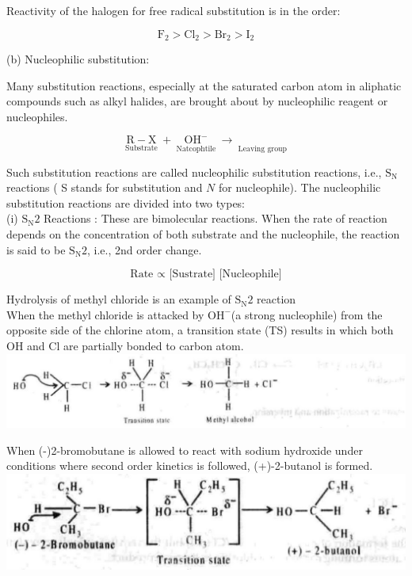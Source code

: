 \documentclass[10pt]{article}
\begin{document}
Reactivity of the halogen for free radical substitution is in the order:

$$
\mathrm{F}_{2}>\mathrm{Cl}_{2}>\mathrm{Br}_{2}>\mathrm{I}_{2}
$$

(b) Nucleophilic substitution:

Many substitution reactions, especially at the saturated carbon atom in aliphatic compounds such as alkyl halides, are brought about by nucleophilic reagent or nucleophiles.

$$
\underset{\text { Substrate }}{\mathrm{R}-\mathrm{X}}+\underset{\text { Natcophtile }}{\mathrm{OH}^{-}} \longrightarrow \underset{\text { Leaving group }}{ }
$$

Such substitution reactions are called nucleophilic substitution reactions, i.e., $\mathrm{S}_{\mathrm{N}}$ reactions ( S stands for substitution and $N$ for nucleophile). The nucleophilic substitution reactions are divided into two types:\\
(i) $\mathrm{S}_{\mathrm{N}} 2$ Reactions : These are bimolecular reactions. When the rate of reaction depends on the concentration of both substrate and the nucleophile, the reaction is said to be $\mathrm{S}_{\mathrm{N}} 2$, i.e., 2nd order change.

$$
\text { Rate } \propto \text { [Sustrate] [Nucleophile] }
$$

Hydrolysis of methyl chloride is an example of $\mathrm{S}_{\mathrm{N}} 2$ reaction\\
When the methyl chloride is attacked by $\mathrm{OH}^{-}$(a strong nucleophile) from the opposite side of the chlorine atom, a transition state (TS) results in which both OH and Cl are partially bonded to carbon atom.\\
\includegraphics[max width=\textwidth, center]{2025_01_28_8470952b98110cec3aabg-091(2)}

When (-)2-bromobutane is allowed to react with sodium hydroxide under conditions where second order kinetics is followed, (+)-2-butanol is formed.\\
\includegraphics[max width=\textwidth, center]{2025_01_28_8470952b98110cec3aabg-092(4)}
\end{document}
